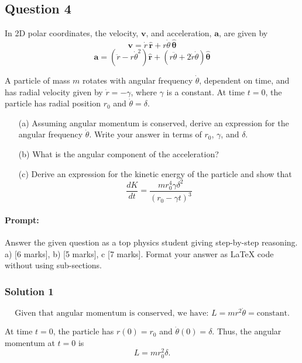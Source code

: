 \documentclass{article}
\begin{document}
\subsection{Question 4}

In 2D polar coordinates, the velocity, \( \mathbf{v} \), and acceleration, \( \mathbf{a} \), are given by
\[
\mathbf{v} = \dot{r} \, \hat{\mathbf{r}} + r \dot{\theta} \, \hat{\boldsymbol{\theta}}
\]
\[
\mathbf{a} = \left( \ddot{r} - r \dot{\theta}^2 \right) \hat{\mathbf{r}} + \left( r \ddot{\theta} + 2 \dot{r} \dot{\theta} \right) \hat{\boldsymbol{\theta}}
\]

A particle of mass \( m \) rotates with angular frequency \( \dot{\theta} \), dependent on time, and has radial velocity given by \( \dot{r} = -\gamma \), where \( \gamma \) is a constant. At time \( t = 0 \), the particle has radial position \( r_0 \) and \( \dot{\theta} = \delta \).

\begin{itemize}
    \item[(a)] Assuming angular momentum is conserved, derive an expression for the angular frequency \( \dot{\theta} \). Write your answer in terms of \( r_0 \), \( \gamma \), and \( \delta \).
    \item[(b)] What is the angular component of the acceleration?
    \item[(c)] Derive an expression for the kinetic energy of the particle and show that
    \[
    \frac{dK}{dt} = \frac{m r_0^4 \gamma \delta^2}{(r_0 - \gamma t)^3}
    \]
\end{itemize}


\paragraph{Prompt: \\} 
Answer the given question as a top physics student giving step-by-step reasoning. a) [6 marks], b) [5 marks], c [7 marks].
Format your answer as LaTeX code without using sub-sections.

\subsubsection{Solution 1}
\[
\text{Given that angular momentum is conserved, we have: } L = m r^2 \dot{\theta} = \text{constant.}
\]

At time \(t=0\), the particle has \(r(0) = r_0\) and \(\dot{\theta}(0) = \delta\). Thus, the angular momentum at \(t=0\) is
\[
L = m r_0^2 \delta.
\]
\end{document}
